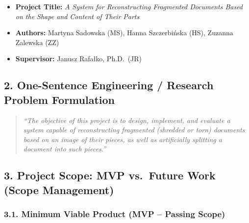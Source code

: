 \documentclass[
]{article}
\providecommand{\tightlist}{%
  \setlength{\itemsep}{0pt}\setlength{\parskip}{0pt}}
\begin{document}
\begin{itemize}
\tightlist
\item
  \textbf{Project Title:} \emph{A System for Reconstructing Fragmented
  Documents Based on the Shape and Content of Their Parts}
\item
  \textbf{Authors:} Martyna Sadowska (MS), Hanna Szczerbińska (HS),
  Zuzanna Zalewska (ZZ)
\item
  \textbf{Supervisor:} Janusz Rafałko, Ph.D.~(JR)
\end{itemize}

\subsection{2. One-Sentence Engineering / Research Problem
Formulation}\label{one-sentence-engineering-research-problem-formulation}

\begin{quote}
\emph{``The objective of this project is to design, implement, and
evaluate a system capable of reconstructing fragmented (shredded or
torn) documents based on an image of their pieces, as well as
artificially splitting a document into such pieces.''}
\end{quote}

\subsection{3. Project Scope: MVP vs.~Future Work (Scope
Management)}\label{project-scope-mvp-vs.-future-work-scope-management}

\subsubsection{3.1. Minimum Viable Product (MVP -- Passing
Scope)}\label{minimum-viable-product-mvp-passing-scope}
\end{document}
